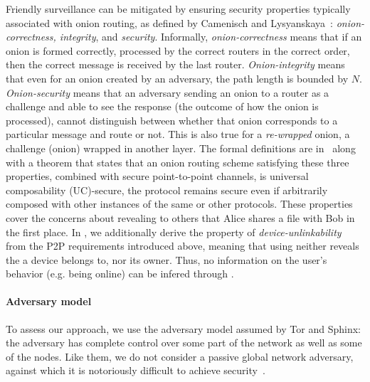 Friendly surveillance can be mitigated by ensuring security properties 
typically associated with onion routing, as defined by Camenisch and Lysyanskaya~\cite{CLOnionRouting}: 
\textit{onion-correctness, integrity}, and \textit{security}. %
Informally, \textit{onion-correctness} means that if an onion is formed
correctly, processed by the correct routers in the correct order, then
the correct message is received by the last router. \textit{Onion-integrity}
means that even for an onion created by an adversary, the path length
is bounded by $N$. \textit{Onion-security} means that an adversary sending an
 onion to a router as a challenge
 and able to see the response (the outcome of how the
onion is processed), cannot distinguish between whether that onion
corresponds to a particular message and route or not. This is also
true for a \emph{re-wrapped} onion, \ie a challenge (onion) wrapped in
another layer. The formal definitions are in~\cite{CLOnionRouting} along
with a theorem that states that an onion routing scheme satisfying
these three properties, combined with secure point-to-point channels,
is universal composability (UC)-secure, \ie the protocol remains
secure even if arbitrarily composed with other instances of the same or other protocols.
These properties cover the concerns about
revealing to others that Alice shares a file with Bob in the first
place. In \name, we additionally derive the property of
\emph{device-unlinkability} from the \ac{P2P} requirements introduced above, meaning that
using \name neither reveals the \squad a device belongs to, nor its
owner. Thus, no information on the user's behavior (e.g. being online)
can be infered through \name. 



\paragraph*{Adversary model} To assess our approach, we use the
adversary model assumed by \ac{Tor} and \ac{Sphinx}:
the adversary has complete control over some part of the network as
well as some of the nodes. Like them, we do not consider a passive global network
adversary, against which it is notoriously difficult to achieve
security~\cite{SystemsForAnonymousCommunication}.
